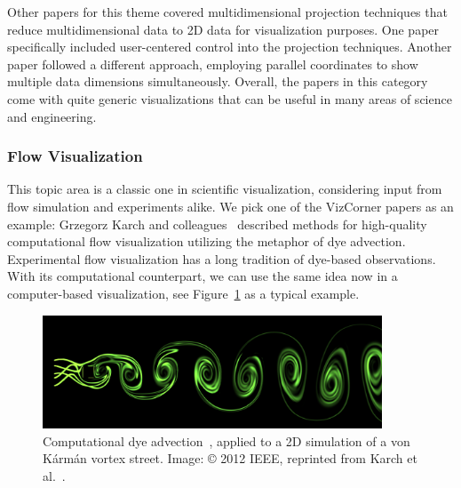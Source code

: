 \documentclass[10pt,journal,compsoc]{IEEEtran}
\begin{document}
{Other papers for this theme covered multidimensional projection techniques that reduce multidimensional data to 2D data for visualization purposes. One paper specifically included user-centered control into the projection techniques. Another paper followed a different approach, employing parallel coordinates to show multiple data dimensions simultaneously. Overall, the papers in this category come with quite generic visualizations that can be useful in many areas of science and engineering.

\subsubsection{Flow Visualization}

This topic area is a classic one in scientific visualization, considering input from flow simulation and experiments alike. We pick one of the VizCorner papers as an example: Grzegorz Karch and colleagues~\cite{Karch2012} described methods for high-quality computational flow visualization utilizing the metaphor of dye advection. Experimental flow visualization has a long tradition of dye-based observations. With its computational counterpart, we can use the same idea now in a computer-based visualization, see Figure~\ref{fig:karman} as a typical example. 

\begin{figure}[th]
	\begin{center}	
		\includegraphics[width=0.9\textwidth]{karman_weno3.png}
		\caption{Computational dye advection~\cite{Karch2012}, applied to a 2D simulation of a von K{\'a}rm{\'a}n vortex street. Image: \copyright{} 2012 IEEE, reprinted from Karch et al.~\cite{Karch2012}.
  \label{fig:karman}}		
	\end{center}
\end{figure}

}
\end{document}
